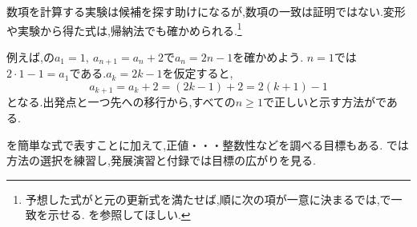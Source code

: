 数項を計算する実験は候補を探す助けになるが,数項の一致は証明ではない.変形や実験から得た式は,帰納法でも確かめられる.\footnote{予想した式がと元の更新式を満たせば,順に次の項が一意に決まるでは,で一致を示せる.
  を参照してほしい.}

例えば,の$a_1=1,\ a_{n+1}=a_n+2$で$a_n=2n-1$を確かめよう.
$n=1$では$2\cdot1-1=a_1$である.$a_k=2k-1$を仮定すると,
\[
  a_{k+1}=a_k+2=(2k-1)+2=2(k+1)-1
\]
となる.出発点と一つ先への移行から,すべての$n\ge1$で正しいと示す方法が\mbox{}である.

を簡単な式で表すことに加えて,正値・・・整数性などを調べる目標もある.
では方法の選択を練習し,発展演習と付録では目標の広がりを見る.
